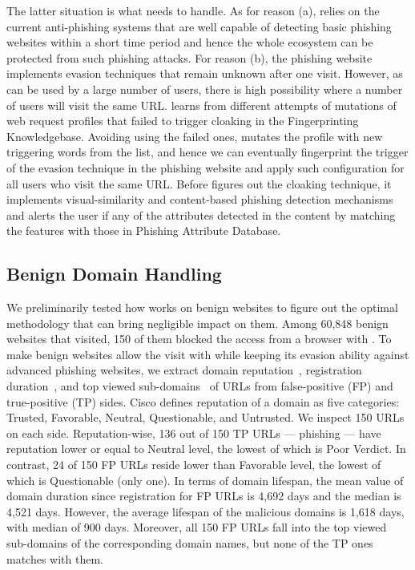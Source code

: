 The latter situation is what \spartacus needs to handle.
As for reason (a), \spartacus relies on the current anti-phishing systems that are well capable of detecting basic phishing websites within a short time period and hence the whole ecosystem can be protected from such phishing attacks.
For reason (b), the phishing website implements evasion techniques that remain unknown after one visit.
However, as \spartacus can be used by a large number of users, there is high possibility where a number of users will visit the same URL.
\spartacus learns from different attempts of mutations of web request profiles that failed to trigger cloaking in the Fingerprinting Knowledgebase.
Avoiding using the failed ones, \spartacus mutates the profile with new triggering words from the list, and hence we can eventually fingerprint the trigger of the evasion technique in the phishing website and apply such configuration for all \spartacus users who visit the same URL.
Before \spartacus figures out the cloaking technique, it implements visual-similarity and content-based phishing detection mechanisms and alerts the user if any of the attributes detected in the content by matching the features with those in Phishing Attribute Database.


\subsection{Benign Domain Handling}

We preliminarily tested how \spartacus works on benign websites to figure out the optimal methodology that can bring negligible impact on them.
Among 60,848 benign websites that \spartacus visited, 150 of them blocked the access from a browser with \spartacus.
To make benign websites allow the visit with \spartacus while keeping its evasion ability against advanced phishing websites,
we extract domain reputation~\cite{reputation}, registration duration~\cite{whois}, and top viewed sub-domains~\cite{topviewedsubdomains} of URLs from false-positive (FP) and true-positive (TP) sides.
Cisco defines reputation of a domain as five categories: Trusted, Favorable, Neutral, Questionable, and Untrusted.
We inspect 150 URLs on each side.
Reputation-wise, 136 out of 150 TP URLs --- phishing --- have reputation lower or equal to Neutral level, the lowest of which is Poor Verdict.
In contrast, 24 of 150 FP URLs reside lower than Favorable level, the lowest of which is Questionable (only one).
In terms of domain lifespan, the mean value of domain duration since registration for FP URLs is 4,692 days and the median is 4,521 days.
However, the average lifespan of the malicious domains is 1,618 days, with median of 900 days.
Moreover, all 150 FP URLs fall into the top viewed sub-domains of the corresponding domain names, but none of the TP ones matches with them.


